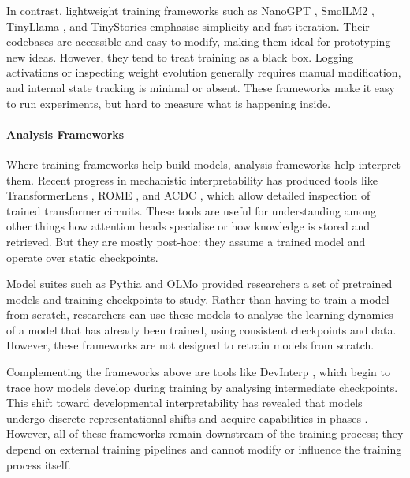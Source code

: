 In contrast, lightweight training frameworks such as NanoGPT \citep{karpathy2023nanogpt}, SmolLM2 \citep{allal2025smollm2}, TinyLlama \citep{zhang2024tinyllama}, and TinyStories \citep{eldan2023tinystories} emphasise simplicity and fast iteration. Their codebases are accessible and easy to modify, making them ideal for prototyping new ideas. However, they tend to treat training as a black box. Logging activations or inspecting weight evolution generally requires manual modification, and internal state tracking is minimal or absent. These frameworks make it easy to run experiments, but hard to measure what is happening inside.


\paragraph{Analysis Frameworks}
Where training frameworks help build models, analysis frameworks help interpret them. Recent progress in mechanistic interpretability has produced tools like TransformerLens \citep{nanda2022transformerlens}, ROME \citep{meng2022locating}, and ACDC \citep{conmy2023towards}, which allow detailed inspection of trained transformer circuits. These tools are useful for understanding among other things how attention heads specialise or how knowledge is stored and retrieved. But they are mostly post-hoc: they assume a trained model and operate over static checkpoints.

Model suites such as Pythia \citep{biderman2023pythia} and OLMo \citep{groeneveld2024olmo} provided researchers a set of pretrained models and training checkpoints to study. Rather than having to train a model from scratch, researchers can use these models to analyse the learning dynamics of a model that has already been trained, using consistent checkpoints and data. However, these frameworks are not designed to retrain models from scratch.

Complementing the frameworks above are tools like DevInterp \citep{devinterpcode}, which begin to trace how models develop during training by analysing intermediate checkpoints. This shift toward developmental interpretability has revealed that models undergo discrete representational shifts and acquire capabilities in phases \citep{hoogland2023towards, hoogland2025losslandscape}. However, all of these frameworks remain downstream of the training process; they depend on external training pipelines and cannot modify or influence the training process itself.

